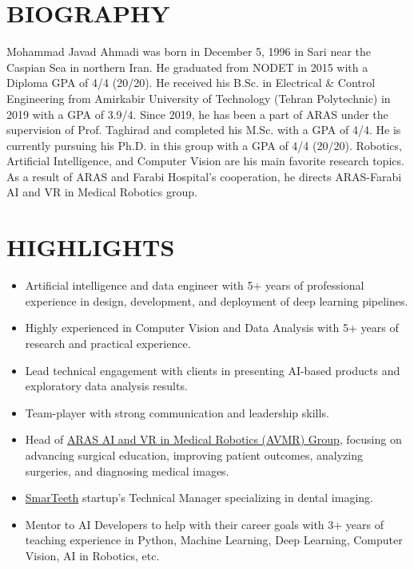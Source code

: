 \documentclass[11pt,a4paper,sans]{moderncv} %
\begin{document}
	
	\makecvtitle
	
\section{BIOGRAPHY}
    Mohammad Javad Ahmadi was born in December 5, 1996 in Sari near the Caspian Sea in northern Iran. He graduated from NODET in 2015 with a Diploma GPA of 4/4 (20/20). He received his B.Sc. in Electrical \& Control Engineering from Amirkabir University of Technology (Tehran Polytechnic) in 2019 with a GPA of 3.9/4. Since 2019, he has been a part of ARAS under the supervision of Prof. Taghirad and completed his M.Sc. with a GPA of 4/4. He is currently pursuing his Ph.D. in this group with a GPA of 4/4 (20/20). Robotics, Artificial Intelligence, and Computer Vision are his main favorite research topics. As a result of ARAS and Farabi Hospital's cooperation, he directs ARAS-Farabi AI and VR in Medical Robotics group.
    
    \section{HIGHLIGHTS}
    
    \begin{itemize}
        \item Artificial intelligence and data engineer with 5+ years of professional experience in design, development, and deployment of deep learning pipelines.
        \item Highly experienced in Computer Vision and Data Analysis with 5+ years of research and practical experience.
        \item Lead technical engagement with clients in presenting AI-based products and exploratory data analysis results.
        \item Team-player with strong communication and leadership skills.
        \item Head of \href{https://aras.kntu.ac.ir/ai}{ARAS AI and VR in Medical Robotics (AVMR) Group}, focusing on advancing surgical education, improving patient outcomes, analyzing surgeries, and diagnosing medical images.
        \item \href{https://smarteeth.ai/}{SmarTeeth} startup's Technical Manager specializing in dental imaging.
        \item Mentor to AI Developers to help with their career goals with 3+ years of teaching experience in Python, Machine Learning, Deep Learning, Computer Vision, AI in Robotics, etc.
    \end{itemize}
	
\end{document}

